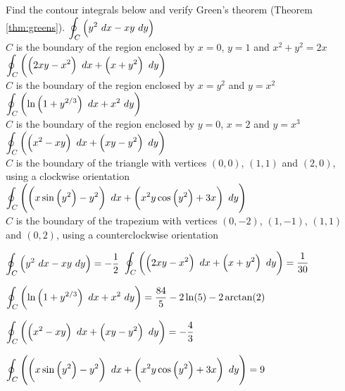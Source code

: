 \begin{Exercise} Find the contour integrals below and verify Green's theorem (Theorem \ref{thm:greens}). %
	\Question[difficulty = 1] $\displaystyle \oint_C \left( y^2\ dx - xy \ dy \right)$ \\[0.2cm]
	$C$ is the boundary of the region enclosed by $x=0$, $y=1$ and $x^2 + y^2 = 2x$ %
	\Question[difficulty = 2] $\displaystyle \oint_C \left( \left(2xy- x^2\right) \ dx + \left(x+y^2 \right) \ dy \right)$  \\[0.2cm]
	$C$ is the boundary of the region enclosed by $x=y^2$ and $y=x^2$  %
	\Question[difficulty = 2] $\displaystyle \oint_C \left( \ln \left(1+y^{2/3}\right) \ dx + x^2\ dy \right)$  \\[0.2cm]
	$C$ is the boundary of the region enclosed by $y=0$, $x=2$ and $y=x^3$  %
	\Question[difficulty = 2] $\ds \oint_C \left( \left( x^2 - xy\right) \ dx + \left( xy-y^2 \right) \ dy \right)$  \\[0.2cm]
	$C$ is the boundary of the triangle with vertices $(0,0)$, $(1,1)$ and $(2,0)$, using a clockwise orientation  %
	\Question[difficulty = 3] $\displaystyle \oint_C \left( \left(x \sin \left( y^2 \right) - y^2\right) \ dx + \left( x^2y \cos \left( y^2 \right) + 3x \right) \ dy \right)$  \\[0.2cm]
	$C$ is the boundary of the trapezium with vertices $(0,-2)$, $(1,-1)$, $(1,1)$ and $(0,2)$, using a counterclockwise orientation   %
\end{Exercise}

\begin{Answer}
    
        \Question $\displaystyle \oint_C \left( y^2\ dx - xy \ dy \right) = - \dfrac{1}{2}$
        \Question $\displaystyle \oint_C \left( \left(2xy- x^2\right) \ dx + \left(x+y^2 \right) \ dy \right) 
        = \dfrac{1}{30}$
       
        \Question  $\displaystyle \oint_C \left( \ln \left(1+y^{2/3}\right) \ dx + x^2\ dy \right) = \dfrac{84}{5} - 2 \ln(5) - 2 \arctan(2)$
     
        \Question $\displaystyle \oint_C \left( \left( x^2 - xy\right) \ dx + \left( xy-y^2 \right) \ dy \right) = - \dfrac{4}{3}$
       
        \Question $\displaystyle \oint_C \left( \left(x \sin \left( y^2 \right) - y^2\right) \ dx + \left( x^2y \cos \left( y^2 \right) + 3x \right) \ dy \right)= 9$
        
    
\end{Answer}


